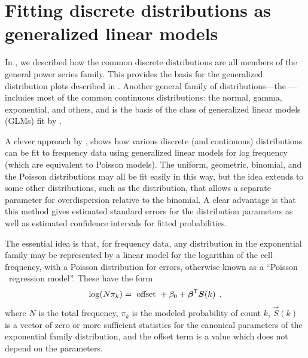 \documentclass[10pt,krantz2]{krantz}\usepackage[]{graphicx}\usepackage[]{color}
\begin{document}

\section{Fitting discrete distributions as generalized linear models}\label{sec:fitglm}

In , we described how the common discrete distributions
are all members of the general power series family.  This provides the
basis for the generalized distribution plots described in .
Another general family of distributions---the ---%
includes most of the common continuous distributions:
the normal, gamma, exponential, and others,
and is the basis of the class of generalized linear models (GLMs) fit
by .

A clever approach by
\citet{LindseyMersch:92}, \citet[\S 6.1]{Lindsey:95} shows how various discrete
(and continuous)
distributions can be fit to frequency data using generalized linear models
for log frequency (which are equivalent to Poisson \loglin models).
The uniform, geometric, binomial, and the
Poisson distributions may all be fit easily in this way, but the idea extends
to some other distributions, such as the  distribution,
that allows a separate parameter for overdispersion relative to the binomial.
A clear advantage is that this method gives estimated standard errors for the
distribution parameters as well as estimated confidence intervals
for fitted probabilities.

The essential idea is that, for frequency data, any distribution in the
exponential family may be represented by a linear model for the logarithm
of the cell frequency, with a Poisson distribution for errors,
otherwise known as a ``Poisson \loglin\ regression model''.
These have the form
\begin{equation*}
\log (N \pi_k) = \textrm{ offset } + \beta_0 + \bm{\beta}^\mathsf{T} \bm{S}(k)
 \:\: ,
\end{equation*}
where $N$ is the total frequency, $\pi_k$ is the modeled probability
of count $k$,
$\vec{S}(k)$ is a vector of zero or more sufficient statistics for the
canonical parameters of the exponential family distribution,
and the offset term is a value which does not depend on the
parameters.
\end{document}
